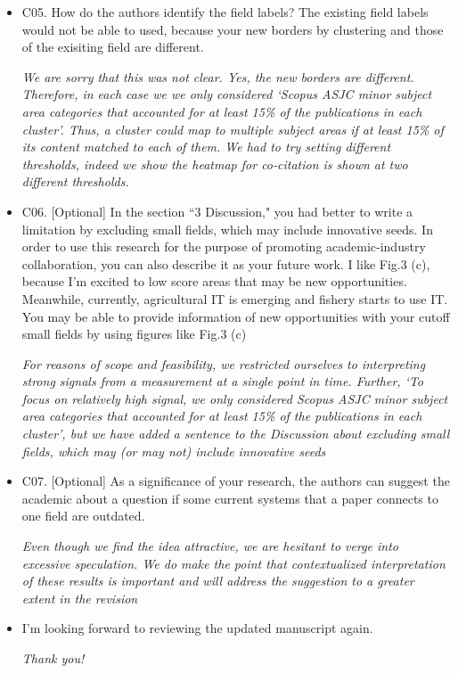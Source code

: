\documentclass[11pt, oneside]{article}   	%
\begin{document}
\begin{itemize}
\item C05. How do the authors identify the field labels? The existing field labels would not be able to used, because your new borders by clustering and those of the exisiting field are different.

\emph{We are sorry that this was not clear. Yes, the new borders are different. Therefore, in each case we we only considered `Scopus ASJC minor subject area categories that accounted for at least 15\% of the publications in each cluster'. Thus, a cluster could map to multiple subject areas if at least 15\% of its content matched to each of them. We had to try setting different thresholds, indeed we show the heatmap for co-citation is shown at two different thresholds.}

\item C06. [Optional] In the section ``3 Discussion,"  you had better to write a limitation by excluding small fields, which may include innovative seeds. In order to use this research for the purpose of promoting academic-industry collaboration, you can also describe it as your future work. I like Fig.3 (c), because I'm excited to low score areas that may be new opportunities. Meanwhile, currently, agricultural IT is emerging and fishery starts to use IT. You may be able to provide information of new opportunities with your cutoff small fields by using figures like Fig.3 (c)

\emph{For reasons of scope and feasibility, we restricted ourselves to interpreting strong signals from a measurement at a single point in time. Further, `To focus on relatively high signal, we only considered Scopus ASJC minor subject area categories that accounted for at least 15\% of the publications in each cluster', but we have added a sentence to the Discussion about excluding small fields, which may (or may not) include innovative seeds}

\item C07. [Optional] As a significance of your research, the authors can suggest the academic about a question if some current systems that a paper connects to one field are outdated.

\emph{Even though we find the idea attractive, we are hesitant to verge into excessive speculation. We do make the point that contextualized interpretation of these results is important and will address the suggestion to a greater extent in the revision}

\item I'm looking forward to reviewing the updated manuscript again.

\emph{Thank you!}

\end{itemize} 
    
\end{document}
